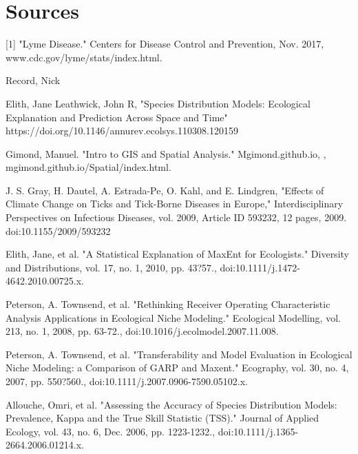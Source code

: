 
\chapter{Sources} %
[1] "Lyme Disease." Centers for Disease Control and Prevention, Nov. 2017, www.cdc.gov/lyme/stats/index.html. \newline

\noindent [2] Record, Nick \newline

\noindent [3] Elith, Jane Leathwick, John R,
"Species Distribution Models: Ecological Explanation and Prediction Across Space and Time" \newline
https://doi.org/10.1146/annurev.ecolsys.110308.120159\newline

\noindent [4] Gimond, Manuel. "Intro to GIS and Spatial Analysis." Mgimond.github.io, , mgimond.github.io/Spatial/index.html. \newline

\noindent [5] J. S. Gray, H. Dautel, A. Estrada-Pe, O. Kahl, and E. Lindgren, 
"Effects of Climate Change on Ticks and Tick-Borne Diseases in Europe,"
Interdisciplinary Perspectives on Infectious Diseases, vol. 2009, Article ID 593232,
12 pages, 2009. doi:10.1155/2009/593232\newline

\noindent [6] Elith, Jane, et al. "A Statistical Explanation of MaxEnt for Ecologists." Diversity and Distributions, 
vol. 17, no. 1, 2010, pp. 43?57., doi:10.1111/j.1472-4642.2010.00725.x.\newline

\noindent [7] Peterson, A. Townsend, et al.
"Rethinking Receiver Operating Characteristic Analysis Applications in Ecological Niche Modeling."
Ecological Modelling, vol. 213, no. 1, 2008, pp. 63-72., doi:10.1016/j.ecolmodel.2007.11.008. \newline

\noindent [8] Peterson, A. Townsend, et al. 
"Transferability and Model Evaluation in Ecological Niche Modeling: a Comparison of GARP and Maxent."
Ecography, vol. 30, no. 4, 2007, pp. 550?560.,
doi:10.1111/j.2007.0906-7590.05102.x.\newline

\noindent [9] Allouche, Omri, et al. 
"Assessing the Accuracy of Species Distribution Models: Prevalence, Kappa and the True Skill Statistic (TSS)." 
Journal of Applied Ecology, vol. 43, no. 6, Dec. 2006, pp. 1223-1232., 
doi:10.1111/j.1365-2664.2006.01214.x. \newline

